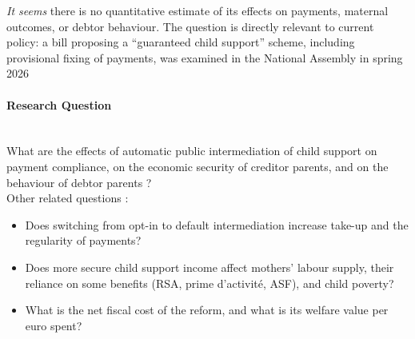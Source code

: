 \documentclass{article}
\begin{document}
\textit{It seems} there is no quantitative estimate of its effects on payments, maternal outcomes, or debtor behaviour. The question is directly relevant to current policy: a bill proposing a “guaranteed child support” scheme, including provisional fixing of payments, was examined in the National Assembly in spring 2026

\paragraph{Research Question} \\

What are the effects of automatic public intermediation of child support on payment compliance, on the economic security of creditor parents, and on the behaviour of debtor parents ? \\

\noindent Other related questions : 
\begin{itemize}
    \item Does switching from opt-in to default intermediation increase take-up and the regularity of payments?
    \item Does more secure child support income affect mothers’ labour supply, their reliance on some benefits (RSA, prime d’activité, ASF), and child poverty?
    \item What is the net fiscal cost of the reform, and what is its welfare value per euro spent?

\end{itemize}
\end{document}
